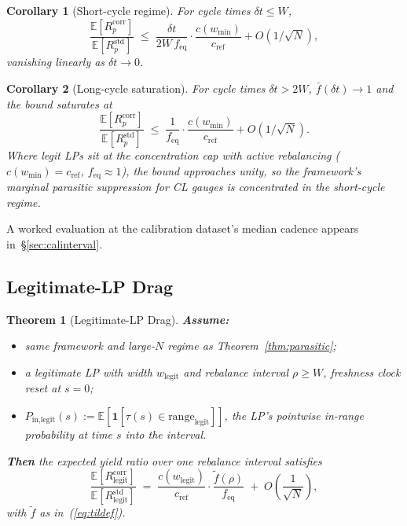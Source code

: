 \documentclass[11pt,a4paper]{article}
\theoremstyle{cgdefinition}
\theoremstyle{cgplain}
\newtheorem{theorem}{Theorem}
\newtheorem{corollary}{Corollary}
\theoremstyle{cgremark}
\begin{document}
\begin{corollary}[Short-cycle regime]\label{cor:short}
For cycle times $\delta t \leq W$,
\[
\frac{\mathbb{E}[R^{\text{corr}}_p]}{\mathbb{E}[R^{\text{std}}_p]} \;\leq\; \frac{\delta t}{2W\,f_{\text{eq}}} \cdot \frac{c(w_{\min})}{c_{\text{ref}}} + O(1/\sqrt{N}),
\]
vanishing linearly as $\delta t \to 0$.
\end{corollary}

\begin{corollary}[Long-cycle saturation]\label{cor:long}
For cycle times $\delta t > 2W$, $\bar f(\delta t) \to 1$ and the bound saturates at
\[
\frac{\mathbb{E}[R^{\text{corr}}_p]}{\mathbb{E}[R^{\text{std}}_p]} \;\leq\; \frac{1}{f_{\text{eq}}} \cdot \frac{c(w_{\min})}{c_{\text{ref}}} + O(1/\sqrt{N}).
\]
Where legit LPs sit at the concentration cap with active rebalancing ($c(w_{\min}) = c_{\text{ref}}$, $f_{\text{eq}} \approx 1$), the bound approaches unity, so the framework's marginal parasitic suppression for CL gauges is concentrated in the short-cycle regime.
\end{corollary}

A worked evaluation at the calibration dataset's median cadence appears in~\S\ref{sec:calinterval}.

\subsection{Legitimate-LP Drag}\label{sec:legit-thm}

\begin{theorem}[Legitimate-LP Drag]\label{thm:legit}
\textbf{Assume:}
\begin{itemize}[leftmargin=2em,nosep,topsep=2pt]
\item same framework and large-$N$ regime as Theorem~\ref{thm:parasitic};
\item a legitimate LP with width $w_{\text{legit}}$ and rebalance interval $\rho \geq W$, freshness clock reset at $s = 0$;
\item $P_{\text{in,legit}}(s) := \mathbb{E}[\mathbf{1}[\tau(s) \in \text{range}_{\text{legit}}]]$, the LP's pointwise in-range probability at time $s$ into the interval.
\end{itemize}

\textbf{Then} the expected yield ratio over one rebalance interval satisfies
\begin{equation}\label{eq:thm2}
\frac{\mathbb{E}[R^{\text{corr}}_{\text{legit}}]}{\mathbb{E}[R^{\text{std}}_{\text{legit}}]} \;=\; \frac{c(w_{\text{legit}})}{c_{\text{ref}}} \cdot \frac{\tilde f(\rho)}{f_{\text{eq}}} \;+\; O\!\left(\frac{1}{\sqrt{N}}\right),
\end{equation}
with $\tilde f$ as in~(\ref{eq:tildef}).
\end{theorem}
\end{document}
